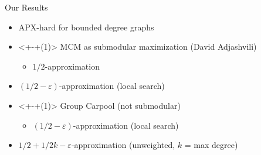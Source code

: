 \begin{frame}[<+>]{Our Results}
\begin{itemize}
  	\item APX-hard for bounded degree graphs 
	\item<+-+(1)> MCM as submodular maximization (David Adjashvili) 
		\begin{itemize}
		  \item $1/2$-approximation 
		\end{itemize}
	\item $(1/2 - \varepsilon)$-approximation (local search)
	\item<+-+(1)> Group Carpool (not submodular)
		\begin{itemize}
			\item $(1/2 - \varepsilon)$-approximation (local search)
		\end{itemize}
	\item $1/2 + 1/2k - \varepsilon$-approximation (unweighted, $k$ = max degree)
\end{itemize}
\end{frame}